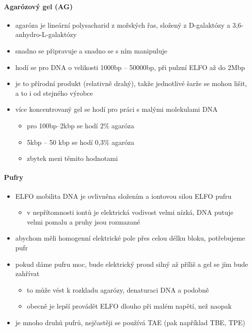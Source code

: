 \documentclass[DIV=8]{scrreprt}
\begin{document}
\paragraph{Agarózový gel (AG)}
\begin{itemize}[nosep]
    \item agaróza je lineární polysacharid z mořských řas, složený z D-galaktózy a 3,6-anhydro-L-galaktózy
    \item snadno se připravuje a snadno se s ním manipuluje
    \item hodí se pro DNA o velikosti 1000bp -- 50000bp, při pulzní ELFO až do 2Mbp
    \item je to přírodní produkt (relativně drahý), takže jednotlivé šarže se mohou lišit, a to i od stejného výrobce
    \item více koncentrovaný gel se hodí pro práci s malými molekulami DNA
\begin{itemize}[nosep]
    \item pro 100bp--2kbp se hodí 2\% agaróza
    \item 5kbp -- 50 kbp se hodí 0,3\% agaróza
    \item zbytek mezi těmito hodnotami
\end{itemize}

\end{itemize}



\paragraph{Pufry}
\begin{itemize}[nosep]
    \item ELFO mobilita DNA je ovlivněna složením a iontovou silou ELFO pufru
\begin{itemize}[nosep]
    \item v nepřítomnosti iontů je elektrická vodivost velmi nízká, DNA putuje velmi pomalu a pruhy jsou rozmazané
\end{itemize}

    \item abychom měli homogenní elektrické pole přes celou délku bloku, potřebujeme pufr
    \item pokud dáme pufru moc, bude elektrický proud silný až příliš a gel se jím bude zahřívat
\begin{itemize}[nosep]
    \item to může vést k rozkladu agarózy, denaturaci DNA a podobně
    \item obecně je lepší provádět ELFO dlouho při malém napětí, než naopak
\end{itemize}

    \item je mnoho druhů pufrů, nejčastěji se používá TAE (pak například TBE, TPE)
\end{itemize}
\end{document}
